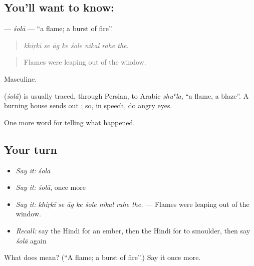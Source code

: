 \subsection*{You'll want to know: }
\textbf{} — \emph{śolā} — \textquotedblleft{}a flame; a burst of fire\textquotedblright{}.

\begin{quote}
       
\end{quote}

\begin{quote}
\emph{khiṛkī se āg ke śole nikal rahe the.}
\end{quote}

\begin{quote}
Flames were leaping out of the window.
\end{quote}

Masculine.

\begin{cousinweb}
\textbf{} (\emph{śolā}) is usually traced, through Persian, to Arabic \emph{shuʿla}, \textquotedblleft{}a flame, a blaze\textquotedblright{}. A burning house sends out \textbf{}; so, in speech, do angry eyes.
\end{cousinweb}

\begin{grammarlens}[title={What you've built}]
One more word for telling what happened.
\end{grammarlens}

\subsection*{Your turn}
\begin{itemize}
\raggedright
  \item \emph{Say it:} \emph{śolā}
  \item \emph{Say it:} \emph{śolā}, once more
  \item \emph{Say it:} \emph{khiṛkī se āg ke śole nikal rahe the.} — Flames were leaping out of the window.
  \item \emph{Recall:} say the Hindi for an ember, then the Hindi for to smoulder, then say \emph{śolā} again
\end{itemize}

\begin{tcolorbox}[breakable,colback=teal!4,colframe=teal!35!black,title={Before you move on}]
What does  mean? (\textquotedblleft{}A flame; a burst of fire\textquotedblright{}.) Say it once more.
\end{tcolorbox}

